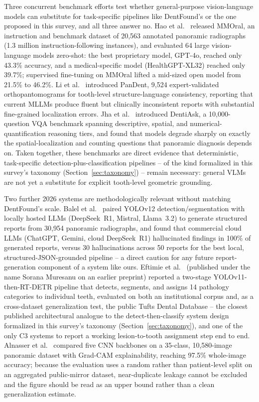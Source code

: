 \documentclass[conference]{IEEEtran}
\begin{document}
Three concurrent benchmark efforts test whether general-purpose
vision-language models can substitute for task-specific pipelines like
DentFound's or the one proposed in this survey, and all three answer
no. Hao et al.~\cite{hao2025mmoral} released MMOral, an instruction and
benchmark dataset of 20,563 annotated panoramic radiographs (1.3
million instruction-following instances), and evaluated 64 large
vision-language models zero-shot: the best proprietary model, GPT-4o,
reached only 43.3\% accuracy, and a medical-specific model
(HealthGPT-XL32) reached only 39.7\%; supervised fine-tuning on MMOral
lifted a mid-sized open model from 21.5\% to 46.2\%. Li et
al.~\cite{li2026pandent} introduced PanDent, 9,524 expert-validated
orthopantomograms for tooth-level structure-language consistency,
reporting that current MLLMs produce fluent but clinically
inconsistent reports with substantial fine-grained localization
errors. Jha et al.~\cite{jha2026dentiask} introduced DentiAsk, a
10,000-question VQA benchmark spanning descriptive, spatial, and
numerical-quantification reasoning tiers, and found that models
degrade sharply on exactly the spatial-localization and counting
questions that panoramic diagnosis depends on. Taken together, these
benchmarks are direct evidence that deterministic, task-specific
detection-plus-classification pipelines -- of the kind formalized in
this survey's taxonomy (Section~\ref{sec:taxonomy}) -- remain
necessary: general VLMs are not yet a substitute for explicit
tooth-level geometric grounding.

Two further 2026 systems are methodologically relevant without
matching DentFound's scale. Balel et al.~\cite{balel2026hybrid}
paired YOLOv12 detection/segmentation with locally hosted LLMs
(DeepSeek~R1, Mistral, Llama~3.2) to generate structured reports from
30,954 panoramic radiographs, and found that commercial cloud LLMs
(ChatGPT, Gemini, cloud DeepSeek~R1) hallucinated findings in 100\% of
generated reports, versus 30 hallucinations across 50 reports for the
best local, structured-JSON-grounded pipeline -- a direct caution for
any future report-generation component of a system like ours.
Eftimie et al.~\cite{eftimie2025tooth} (published under the name
Sorana Muresanu on an earlier preprint) reported a two-stage
YOLOv11-then-RT-DETR pipeline that detects, segments, and assigns 14
pathology categories to individual teeth, evaluated on both an
institutional corpus and, as a cross-dataset generalization test, the
public Tufts Dental Database -- the closest published architectural
analogue to the detect-then-classify system design formalized in this
survey's taxonomy (Section~\ref{sec:taxonomy}), and one of the only C3
systems to report a working lesion-to-tooth assignment step end to
end. Alnasser et
al.~\cite{alnasser2026advanced} compared five CNN backbones on a
35-class, 10,580-image panoramic dataset with Grad-CAM explainability,
reaching 97.5\% whole-image accuracy; because the evaluation uses a
random rather than patient-level split on an aggregated public-mirror
dataset, near-duplicate leakage cannot be excluded and the figure
should be read as an upper bound rather than a clean generalization
estimate.
\end{document}
